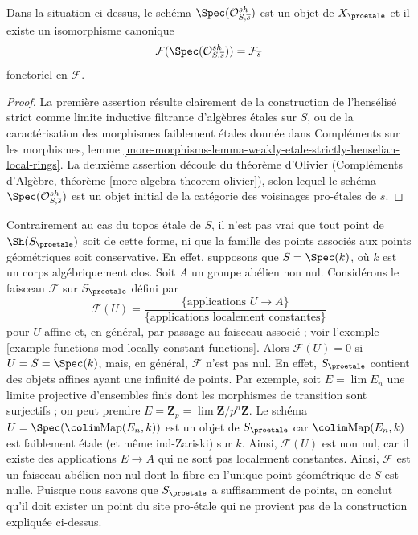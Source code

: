 \begin{lemma}
\label{lemma-classical-point}
Dans la situation ci-dessus, le schéma $\Spec(\mathcal{O}_{S, \overline{s}}^{sh})$
est un objet de $X_\proetale$ et il existe un isomorphisme canonique
$$
\mathcal{F}(\Spec(\mathcal{O}_{S, \overline{s}}^{sh})) =
\mathcal{F}_{\overline{s}}
$$
fonctoriel en $\mathcal{F}$.
\end{lemma}

\begin{proof}
La première assertion résulte clairement de la construction de l'hensélisé strict
comme limite inductive filtrante d'algèbres \'etales sur $S$, ou de la caractérisation
des morphismes faiblement \'etales donnée dans
Compléments sur les morphismes, lemme
\ref{more-morphisms-lemma-weakly-etale-strictly-henselian-local-rings}.
La deuxième assertion découle du théorème d'Olivier
(Compléments d'Algèbre, théorème \ref{more-algebra-theorem-olivier}),
selon lequel le schéma $\Spec(\mathcal{O}_{S, \overline{s}}^{sh})$
est un objet initial de la catégorie des voisinages pro-\'etales
de $\overline{s}$.
\end{proof}

\noindent
Contrairement au cas du topos \'etale de $S$, il n'est pas vrai
que tout point de $\Sh(S_\proetale)$ soit de cette forme, ni que
la famille des points associés aux points géométriques soit
conservative. En effet, supposons que $S = \Spec(k)$, où $k$ est un
corps algébriquement clos. Soit $A$ un groupe abélien non nul.
Considérons le faisceau $\mathcal{F}$ sur $S_\proetale$ défini par
$$
\mathcal{F}(U) =
\frac{\{\text{applications }U \to A\}}{\{\text{applications localement constantes}\}}
$$
pour $U$ affine et, en général, par passage au faisceau associé ; voir
l'exemple \ref{example-functions-mod-locally-constant-functions}.
Alors $\mathcal{F}(U) = 0$ si $U = S = \Spec(k)$, mais, en général, $\mathcal{F}$
n'est pas nul. En effet, $S_\proetale$ contient des objets affines
ayant une infinité de points. Par exemple, soit $E = \lim E_n$
une limite projective d'ensembles finis dont les morphismes de transition sont surjectifs ;
on peut prendre $E = \mathbf{Z}_p = \lim \mathbf{Z}/p^n\mathbf{Z}$. Le schéma
$U = \Spec(\colim \text{Map}(E_n, k))$ est un objet de $S_\proetale$
car $\colim \text{Map}(E_n, k)$ est faiblement \'etale (et même ind-Zariski)
sur $k$. Ainsi, $\mathcal{F}(U)$ est non nul, car il existe des applications $E \to A$
qui ne sont pas localement constantes.
Ainsi, $\mathcal{F}$ est un faisceau abélien non nul dont la fibre en l'unique
point géométrique de $S$ est nulle. Puisque nous savons que $S_\proetale$
a suffisamment de points, on conclut qu'il doit exister un point du site pro-\'etale
qui ne provient pas de la construction expliquée ci-dessus.

